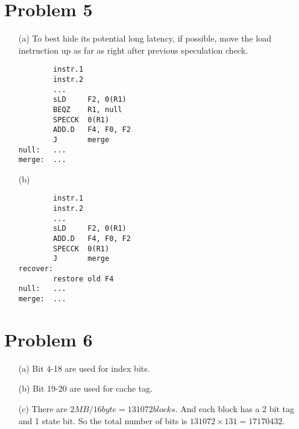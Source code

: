 \documentclass[11pt,leqno]{article}
\begin{document}
\section*{Problem 5}
\begin{enumerate}
\item[(a)]
To best hide its potential long latency, if possible, move the load instruction up as far as right after previous speculation check.
\begin{verbatim}
        instr.1
        instr.2
        ...
        sLD     F2, 0(R1)
        BEQZ    R1, null
        SPECCK  0(R1)
        ADD.D   F4, F0, F2
        J       merge
null:   ...
merge:  ...
\end{verbatim}

\item[(b)]
\begin{verbatim}
        instr.1
        instr.2
        ...
        sLD     F2, 0(R1)
        ADD.D   F4, F0, F2
        SPECCK  0(R1)
        J       merge
recover:
        restore old F4
null:   ...
merge:  ...
\end{verbatim}

\end{enumerate}
\section*{Problem 6}
\begin{enumerate}
\item[(a)] Bit 4-18 are used for index bits. 

\item[(b)] Bit 19-20 are used for cache tag.

\item[(c)] There are $2MB/16byte=131072 blocks$. And each block has a 2 bit tag and 1 state bit. So the total number of bits is $131072\times131=17170432$.

\end{enumerate}
\end{document}

